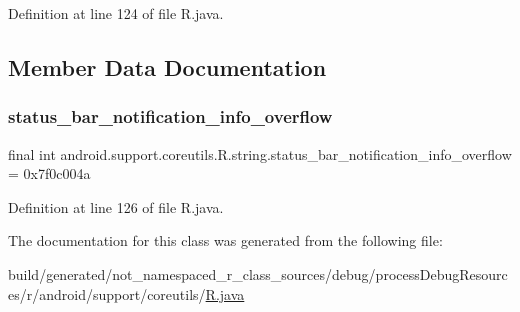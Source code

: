Definition at line 124 of file R.\+java.


\begin{DoxyCode}{0}

\end{DoxyCode}


\subsection{Member Data Documentation}
\mbox{\label{classandroid_1_1support_1_1coreutils_1_1_r_1_1string_ac3802014c312560d8974b22579aba880}} 
\subsubsection{\texorpdfstring{status\_bar\_notification\_info\_overflow}{status\_bar\_notification\_info\_overflow}}
{\footnotesize\ttfamily final int android.\+support.\+coreutils.\+R.\+string.\+status\+\_\+bar\+\_\+notification\+\_\+info\+\_\+overflow = 0x7f0c004a\hspace{0.3cm}{\ttfamily [static]}}



Definition at line 126 of file R.\+java.



The documentation for this class was generated from the following file\+:\begin{DoxyCompactItemize}
\item 
build/generated/not\+\_\+namespaced\+\_\+r\+\_\+class\+\_\+sources/debug/process\+Debug\+Resources/r/android/support/coreutils/\mbox{\hyperlink{android_2support_2coreutils_2_r_8java}{R.\+java}}\end{DoxyCompactItemize}
